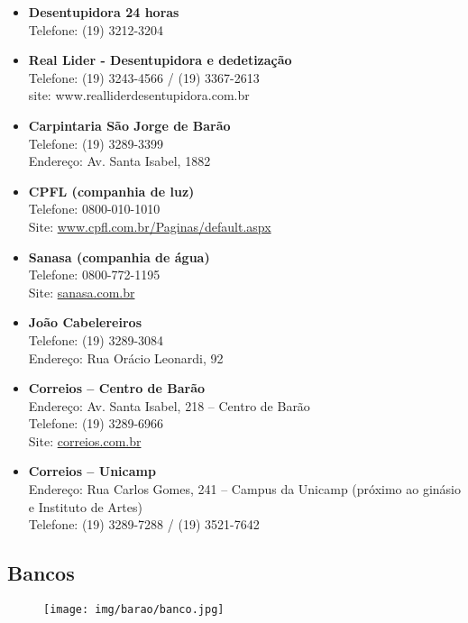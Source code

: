\begin{itemize}
\item \textbf{Desentupidora 24 horas}
  \\Telefone: (19) 3212-3204

\item \textbf{Real Lider - Desentupidora e dedetização}
  \\Telefone: (19) 3243-4566 / (19) 3367-2613
  \\site: www.realliderdesentupidora.com.br

\item \textbf{Carpintaria São Jorge de Barão}
  \\Telefone: (19) 3289-3399
  \\Endereço: Av. Santa Isabel, 1882

\item \textbf{CPFL (companhia de luz)}
  \\Telefone: 0800-010-1010
  \\Site: \url{www.cpfl.com.br/Paginas/default.aspx}

\item \textbf{Sanasa (companhia de água)}
  \\Telefone: 0800-772-1195
  \\Site: \url{sanasa.com.br}

\item \textbf{João Cabelereiros}
  \\Telefone: (19) 3289-3084
  \\Endereço: Rua Orácio Leonardi, 92

\item \textbf{Correios -- Centro de Barão}
  \\Endereço: Av. Santa Isabel, 218 -- Centro de Barão
  \\Telefone: (19) 3289-6966
  \\Site: \url{correios.com.br}

\item \textbf{Correios -- Unicamp}
  \\Endereço: Rua Carlos Gomes, 241 -- Campus da Unicamp (próximo ao
  ginásio e Instituto de Artes)
  \\Telefone: (19) 3289-7288 / (19) 3521-7642
\end{itemize}

\subsection{Bancos}

\begin{figure}[h!]
  \centering
  \texttt{[image: img/barao/banco.jpg]}
\end{figure}


